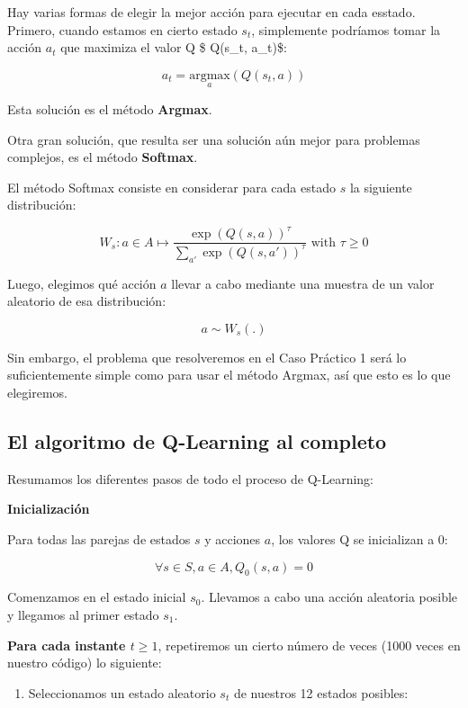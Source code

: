 \documentclass[
]{book}
\providecommand{\tightlist}{%
  \setlength{\itemsep}{0pt}\setlength{\parskip}{0pt}}
\begin{document}
Hay varias formas de elegir la mejor acción para ejecutar en cada esstado. Primero, cuando estamos en cierto estado \(s_t\), simplemente podríamos tomar la acción \(a_t\) que maximiza el valor Q \$ Q(s\_t, a\_t)\$:

\[a_t = \underset{a}{\textrm{argmax}}(Q(s_t,a))\]

Esta solución es el método \textbf{Argmax}.

Otra gran solución, que resulta ser una solución aún mejor para problemas complejos, es el método \textbf{Softmax}.

El método Softmax consiste en considerar para cada estado \(s\) la siguiente distribución:

\[W_s: a \in A \mapsto \frac{\exp(Q(s,a))^{\tau}}{\sum_{a'}\exp(Q(s,a'))^{\tau}} \textrm{ with } \tau \ge 0\]

Luego, elegimos qué acción \(a\) llevar a cabo mediante una muestra de un valor aleatorio de esa distribución:

\[a \sim W_s(.)\]

Sin embargo, el problema que resolveremos en el Caso Práctico 1 será lo suficientemente simple como para usar el método Argmax, así que esto es lo que elegiremos.

\hypertarget{el-algoritmo-de-q-learning-al-completo}{%
\subsection{El algoritmo de Q-Learning al completo}\label{el-algoritmo-de-q-learning-al-completo}}

Resumamos los diferentes pasos de todo el proceso de Q-Learning:

\textbf{Inicialización}

Para todas las parejas de estados \(s\) y acciones \(a\), los valores Q se inicializan a 0:

\[\forall s \in S, a \in A, Q_0(s,a) = 0\]

Comenzamos en el estado inicial \(s_0\). Llevamos a cabo una acción aleatoria posible y llegamos al primer estado \(s_1\).

\textbf{Para cada instante \(t \ge 1\)}, repetiremos un cierto número de veces (1000 veces en nuestro código) lo siguiente:

\begin{enumerate}
\def\labelenumi{\arabic{enumi}.}
\tightlist
\item
  Seleccionamos un estado aleatorio \(s_t\) de nuestros 12 estados posibles:
\end{enumerate}
\end{document}
